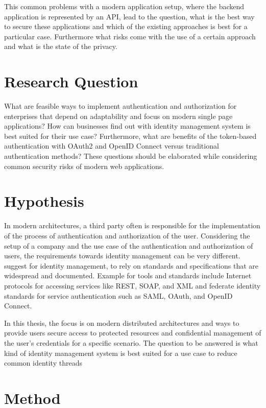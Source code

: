 This common problems with a modern application setup, where the backend application is represented by an API, lead to the question, what is the best way to secure these applications and which of the existing approaches is best for a particular case. Furthermore what risks come with the use of a certain approach and what is the state of the privacy.  


\section{Research Question}

What are feasible ways to implement authentication and authorization for enterprises that depend on adaptability and focus on modern single page applications? How can businesses find out with identity management system is best suited for their use case? Furthermore, what are benefits of the token-based authentication with OAuth2 and OpenID Connect versus traditional authentication methods? These questions should be elaborated while considering common security risks of modern web applications.

\section{Hypothesis}

In modern architectures, a third party often is responsible for the implementation of the process of authentication and authorization of the user. Considering the setup of a company and the use case of the authentication and authorization of users, the requirements towards identity management can be very different. \cite{NIST:2017:DIG} suggest for identity management, to rely on standards and specifications that are widespread and documented. Example for tools and standards include Internet protocols for accessing services like REST, SOAP, and XML and federate identity standards for service authentication such as SAML, OAuth, and OpenID Connect.

In this thesis, the focus is on modern distributed architectures and ways to provide users secure access to protected resources and confidential management of the user’s credentials for a specific scenario. The question to be answered is what kind of identity management system is best suited for a use case to reduce common identity threads 


\section{Method}

